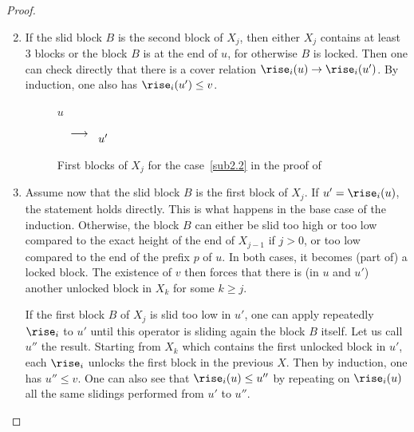 \begin{proof}
\begin{enumerate}
\setcounter{enumi}{1}
\item\label{sub2.2} 
%
If the slid block $B$ is the second block of $X_j$, then either
  $X_j$ contains at least~$3$ blocks or the block $B$ is at the end of
  $u$, for otherwise $B$ is locked.  Then one can
  check directly that there is a cover relation
  $\rise_i(u) \to \rise_i(u')$. By induction, one also has $\rise_i(u') \leq v$.

  \begin{figure}[htb]
    \centering
    $u$$\quad\phantom{\longrightarrow}\put(-15,5){$\longrightarrow$} \quad u'$
    \caption{First blocks of $X_j$ for the case~\ref{sub2.2} in the proof of }
    \label{cas2.2}
  \end{figure}

\setcounter{enumi}{0}
\item\label{sub2.1} 
%
Assume now that the slid block $B$ is the first block of
  $X_j$. If $u' = \rise_i(u)$, the statement holds directly. This is
  what happens in the base case of the induction. Otherwise, the block
  $B$ can either be slid too high or too low compared to the exact
  height of the end of $X_{j-1}$ if $j > 0$, or too low compared to the end of the
  prefix $p$ of $u$. In both cases, it becomes (part of) a locked
  block. The existence of $v$ then forces that there is (in $u$ and $u'$) another
  unlocked block in $X_k$ for some $k \geq j$.

  If the first block $B$ of $X_j$ is slid too low in $u'$, one can
  apply repeatedly $\rise_i$ to $u'$ until this operator is sliding
  again the block $B$ itself. Let us call $u''$ the result. Starting
  from $X_k$ which contains the first unlocked block in $u'$, each
  $\rise_i$ unlocks the first block in the previous $X$. Then by
  induction, one has $u'' \leq v$. One can also see that
  $\rise_i(u) \leq u''$ by repeating on $\rise_i(u)$ all the same
  slidings performed from $u'$ to $u''$.


\end{enumerate}
\end{proof}
